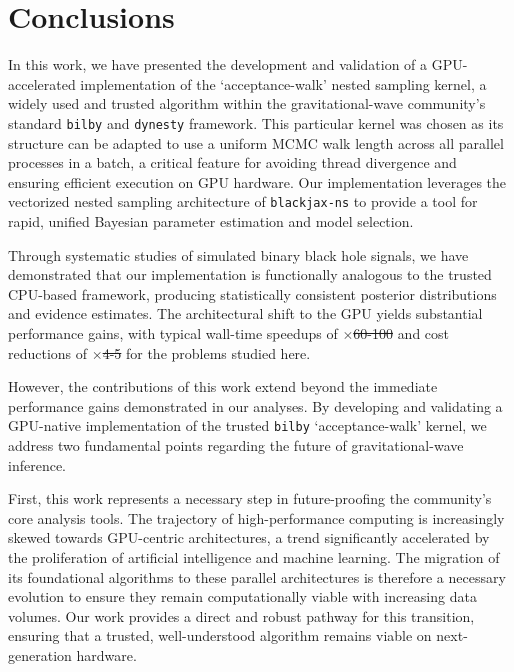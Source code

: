 \documentclass[fleqn,usenatbib]{mnras}
\providecommand{\DIFdel}[1]{{\protect\color{red}\sout{#1}}}                      %
\providecommand{\DIFaddbegin}{} %
\providecommand{\DIFaddend}{} %
\providecommand{\DIFdelbegin}{} %
\providecommand{\DIFdelend}{} %
\newcommand{\DIFscaledelfig}{0.5}
\newlength{\DIFdelgraphicswidth} %
\newlength{\DIFdelgraphicsheight} %
\newcommand{\DIFaddincludegraphics}[2][]{{\color{blue}\fbox{\DIFOincludegraphics[#1]{#2}}}} %
\newcommand{\DIFdelincludegraphics}[2][]{%
\sbox{\DIFdelgraphicsbox}{\DIFOincludegraphics[#1]{#2}}%
\settoboxwidth{\DIFdelgraphicswidth}{\DIFdelgraphicsbox} %
\settoboxtotalheight{\DIFdelgraphicsheight}{\DIFdelgraphicsbox} %
\scalebox{\DIFscaledelfig}{%
\parbox[b]{\DIFdelgraphicswidth}{\usebox{\DIFdelgraphicsbox}\\[-\baselineskip] \rule{\DIFdelgraphicswidth}{0em}}\llap{\resizebox{\DIFdelgraphicswidth}{\DIFdelgraphicsheight}{%
\setlength{\unitlength}{\DIFdelgraphicswidth}%
\begin{picture}(1,1)%
\thicklines\linethickness{2pt} %
{\color[rgb]{1,0,0}\put(0,0){\framebox(1,1){}}}%
{\color[rgb]{1,0,0}\put(0,0){\line( 1,1){1}}}%
{\color[rgb]{1,0,0}\put(0,1){\line(1,-1){1}}}%
\end{picture}%
}\hspace*{3pt}}} %
} %
\DeclareRobustCommand{\DIFaddbegin}{\DIFOaddbegin \let\includegraphics\DIFaddincludegraphics} %
\DeclareRobustCommand{\DIFaddend}{\DIFOaddend \let\includegraphics\DIFOincludegraphics} %
\DeclareRobustCommand{\DIFdelbegin}{\DIFOdelbegin \let\includegraphics\DIFdelincludegraphics} %
\DeclareRobustCommand{\DIFdelend}{\DIFOaddend \let\includegraphics\DIFOincludegraphics} %
\begin{document}
\section{Conclusions}
\label{sec:conclusions}

In this work, we have presented the development and validation of a
GPU-accelerated implementation of the `acceptance-walk' nested sampling
kernel, a widely used and trusted algorithm within the gravitational-wave
community's standard \texttt{bilby} and \texttt{dynesty} framework. This
particular kernel was chosen as its structure can be adapted to use a
uniform MCMC walk length across all parallel processes in a batch, a
critical feature for avoiding thread divergence and ensuring efficient
execution on GPU hardware. Our implementation leverages the vectorized
nested sampling architecture of \texttt{blackjax-ns} to provide a tool
for rapid, unified Bayesian parameter estimation and model selection.

Through systematic studies of simulated binary black hole signals, we have demonstrated
that our implementation is functionally analogous to the trusted
CPU-based framework, producing statistically consistent posterior
distributions and evidence estimates. The architectural shift to the
GPU yields substantial performance gains, with typical wall-time
speedups of $\times$\DIFdelbegin \DIFdel{60-100 }\DIFdelend \DIFaddbegin {} \DIFaddend and cost reductions of
$\times$\DIFdelbegin \DIFdel{4-5 }\DIFdelend \DIFaddbegin {} \DIFaddend for the problems studied here.

However, the contributions of this work extend beyond the immediate performance
gains demonstrated in our analyses. By developing and validating a
GPU-native implementation of the trusted \texttt{bilby} `acceptance-walk'
kernel, we address two fundamental points regarding the future of
gravitational-wave inference.

First, this work represents a necessary step in future-proofing the
community's core analysis tools. The trajectory of high-performance
computing is increasingly skewed towards GPU-centric architectures, a
trend significantly accelerated by the proliferation of artificial
intelligence and machine learning. The migration of its foundational algorithms to these parallel
architectures is therefore a necessary evolution to ensure they remain
computationally viable with increasing data volumes. Our work provides a direct
and robust pathway for this transition, ensuring that a trusted,
well-understood algorithm remains viable on next-generation hardware.
\end{document}
